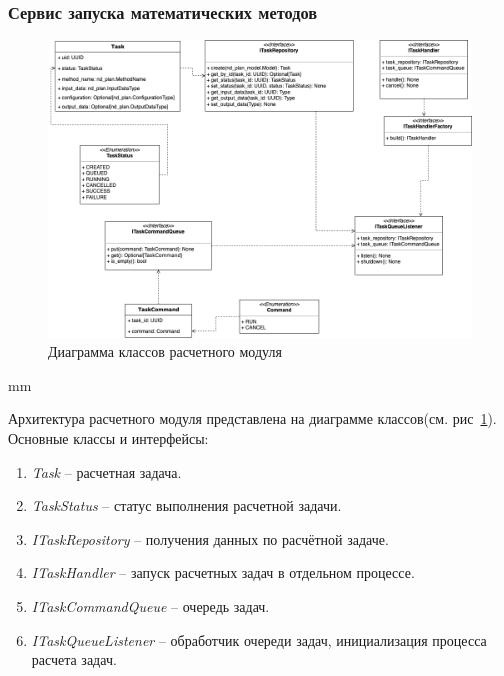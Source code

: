 \subsubsection{\large{Сервис запуска математических методов}}

\begin{figure}[H]
	\includegraphics[width=\textwidth]{architecture/pictures/executor/execution_classes_diagram}
	\caption{Диаграмма классов расчетного модуля}
	\label{pic:architecture__execution-classes-diagram}
\end{figure}
 mm

Архитектура расчетного модуля представлена на диаграмме классов(см. рис\ \ref{pic:architecture__execution-classes-diagram}).
Основные классы и интерфейсы:
\begin{enumerate}
	\item \textit{Task} -- расчетная задача.
	\item \textit{TaskStatus} -- статус выполнения расчетной задачи.
	\item \textit{ITaskRepository} -- получения данных по расчётной задаче.
	\item \textit{ITaskHandler} -- запуск расчетных задач в отдельном процессе.
	\item \textit{ITaskCommandQueue} -- очередь задач.
	\item \textit{ITaskQueueListener} -- обработчик очереди задач, инициализация процесса расчета задач.
\end{enumerate}


